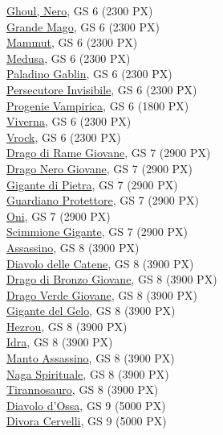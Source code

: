 \begin{multicols}{3}
{\hyperlink{Ghoul, Nero}{Ghoul, Nero}, GS 6 (2300 PX)\\
\hyperlink{Grande Mago}{Grande Mago}, GS 6 (2300 PX)\\
\hyperlink{Mammut}{Mammut}, GS 6 (2300 PX)\\
\hyperlink{Medusa}{Medusa}, GS 6 (2300 PX)\\
\hyperlink{Paladino Gablin}{Paladino Gablin}, GS 6 (2300 PX)\\
\hyperlink{Persecutore Invisibile}{Persecutore Invisibile}, GS 6 (2300 PX)\\
\hyperlink{Progenie Vampirica}{Progenie Vampirica}, GS 6 (1800 PX)\\
\hyperlink{Viverna}{Viverna}, GS 6 (2300 PX)\\
\hyperlink{Vrock}{Vrock}, GS 6 (2300 PX)\\
\hyperlink{Drago di Rame Giovane}{Drago di Rame Giovane}, GS 7 (2900 PX)\\
\hyperlink{Drago Nero Giovane}{Drago Nero Giovane}, GS 7 (2900 PX)\\
\hyperlink{Gigante di Pietra}{Gigante di Pietra}, GS 7 (2900 PX)\\
\hyperlink{Guardiano Protettore}{Guardiano Protettore}, GS 7 (2900 PX)\\
\hyperlink{Oni}{Oni}, GS 7 (2900 PX)\\
\hyperlink{Scimmione Gigante}{Scimmione Gigante}, GS 7 (2900 PX)\\
\hyperlink{Assassino}{Assassino}, GS 8 (3900 PX)\\
\hyperlink{Diavolo delle Catene}{Diavolo delle Catene}, GS 8 (3900 PX)\\
\hyperlink{Drago di Bronzo Giovane}{Drago di Bronzo Giovane}, GS 8 (3900 PX)\\
\hyperlink{Drago Verde Giovane}{Drago Verde Giovane}, GS 8 (3900 PX)\\
\hyperlink{Gigante del Gelo}{Gigante del Gelo}, GS 8 (3900 PX)\\
\hyperlink{Hezrou}{Hezrou}, GS 8 (3900 PX)\\
\hyperlink{Idra}{Idra}, GS 8 (3900 PX)\\
\hyperlink{Manto Assassino}{Manto Assassino}, GS 8 (3900 PX)\\
\hyperlink{Naga Spirituale}{Naga Spirituale}, GS 8 (3900 PX)\\
\hyperlink{Tirannosauro}{Tirannosauro}, GS 8 (3900 PX)\\
\hyperlink{Diavolo d'Ossa}{Diavolo d'Ossa}, GS 9 (5000 PX)\\
\hyperlink{Divora Cervelli}{Divora Cervelli}, GS 9 (5000 PX)\\
}
\end{multicols}

